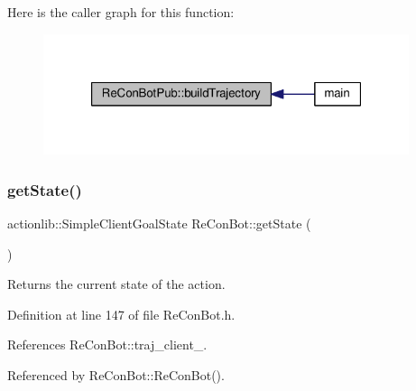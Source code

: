 Here is the caller graph for this function\+:\nopagebreak
\begin{figure}[H]
\begin{center}
\leavevmode
\includegraphics[width=304pt]{d6/d1b/class_re_con_bot_pub_af99f5189cd8e834d7b59f1b106b99345_icgraph}
\end{center}
\end{figure}
\mbox{\label{class_re_con_bot_a3d9656755c06ded1f3b88ce05565f758}} 
\subsubsection{\texorpdfstring{get\+State()}{getState()}}
{\footnotesize\ttfamily actionlib\+::\+Simple\+Client\+Goal\+State Re\+Con\+Bot\+::get\+State (\begin{DoxyParamCaption}{ }\end{DoxyParamCaption})\hspace{0.3cm}{\ttfamily [inherited]}}



Returns the current state of the action. 



Definition at line 147 of file Re\+Con\+Bot.\+h.



References Re\+Con\+Bot\+::traj\+\_\+client\+\_\+.



Referenced by Re\+Con\+Bot\+::\+Re\+Con\+Bot().


